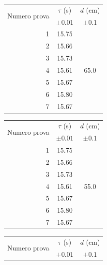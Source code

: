 \documentclass{article}
\begin{document}
\begin{table}[h!]
	\hspace{-0.05\textwidth}
	\begin{minipage}{0.1\textwidth}
			\begin{tabular}{ | r | c | c | }
    				\hline
    				\multirow{2}{5em}{Numero prova} & $\tau$ (s) & $d$ (cm) \\
    				& $\pm 0.01$ & $\pm 0.1$ \\
    				\hline
    				1 & 15.75 & \multirow{7}{*}{65.0} \\ \cline{1-2}
    				2 & 15.66 & \\ \cline{1-2}
    				3 & 15.73 & \\ \cline{1-2}
    				4 & 15.61 & \\ \cline{1-2}
    				5 & 15.67 & \\ \cline{1-2}
    				6 & 15.80 & \\ \cline{1-2}
    				7 & 15.67 & \\ \cline{1-2}
    				\hline
			\end{tabular}
	\end{minipage}
	\hspace{0.3\textwidth}
	\begin{minipage}{0.1\textwidth}
			\begin{tabular}{ | r | c | c | }
    				\hline
    				\multirow{2}{5em}{Numero prova} & $\tau$ (s) & $d$ (cm) \\
    				& $\pm 0.01$ & $\pm 0.1$ \\
    				\hline
    				1 & 15.75 & \multirow{7}{*}{55.0} \\ \cline{1-2}
    				2 & 15.66 & \\ \cline{1-2}
    				3 & 15.73 & \\ \cline{1-2}
    				4 & 15.61 & \\ \cline{1-2}
    				5 & 15.67 & \\ \cline{1-2}
    				6 & 15.80 & \\ \cline{1-2}
    				7 & 15.67 & \\ \cline{1-2}
    				\hline
			\end{tabular}
	\end{minipage}
	\hspace{0.3\textwidth}
	\begin{minipage}{0.1\textwidth}
			\begin{tabular}{ | r | c | c | }
    				\hline
    				\multirow{2}{5em}{Numero prova} & $\tau$ (s) & $d$ (cm) \\
    				& $\pm 0.01$ & $\pm 0.1$ \\

\end{tabular}
\end{minipage}
\end{table}
\end{document}
